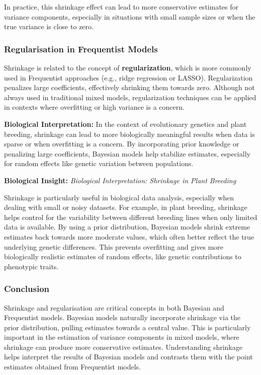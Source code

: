 \documentclass[12pt,a4paper]{article}
\newenvironment{biologicalinsightbox}[1][]
{\begin{basebox}[linecolor=uqpurple]
\textbf{\color{uqpurple}Biological Insight:} \textit{#1}\par\noindent\ignorespaces}
{\end{basebox}}
\begin{document}
In practice, this shrinkage effect can lead to more conservative estimates for variance components, especially in situations with small sample sizes or when the true variance is close to zero.

\subsubsection{Regularisation in Frequentist Models}

Shrinkage is related to the concept of \textbf{regularization}, which is more commonly used in Frequentist approaches (e.g., ridge regression or LASSO). Regularization penalizes large coefficients, effectively shrinking them towards zero. Although not always used in traditional mixed models, regularization techniques can be applied in contexts where overfitting or high variance is a concern.

\textbf{Biological Interpretation:} In the context of evolutionary genetics and plant breeding, shrinkage can lead to more biologically meaningful results when data is sparse or when overfitting is a concern. By incorporating prior knowledge or penalizing large coefficients, Bayesian models help stabilize estimates, especially for random effects like genetic variation between populations.

\begin{biologicalinsightbox}[Biological Interpretation: Shrinkage in Plant Breeding]
Shrinkage is particularly useful in biological data analysis, especially when dealing with small or noisy datasets. For example, in plant breeding, shrinkage helps control for the variability between different breeding lines when only limited data is available. By using a prior distribution, Bayesian models shrink extreme estimates back towards more moderate values, which often better reflect the true underlying genetic differences. This prevents overfitting and gives more biologically realistic estimates of random effects, like genetic contributions to phenotypic traits.
\end{biologicalinsightbox}

\subsubsection{Conclusion}

Shrinkage and regularisation are critical concepts in both Bayesian and Frequentist models. Bayesian models naturally incorporate shrinkage via the prior distribution, pulling estimates towards a central value. This is particularly important in the estimation of variance components in mixed models, where shrinkage can produce more conservative estimates. Understanding shrinkage helps interpret the results of Bayesian models and contrasts them with the point estimates obtained from Frequentist models.
\end{document}
